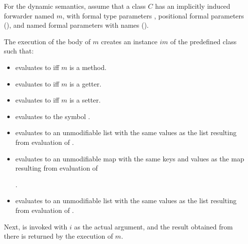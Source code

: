 \documentclass[makeidx]{article}
\begin{document}
\LMHash{}%
For the dynamic semantics,
assume that a class $C$ has an implicitly induced
 forwarder named $m$,
with formal type parameters
,
positional formal parameters
(),
and named formal parameters with names
().


\LMHash{}%
The execution of the body of $m$ creates
an instance $im$ of the predefined class 
such that:

\begin{itemize}
\item {} evaluates to \code{\TRUE{}} if{}f $m$ is a method.
\item {} evaluates to \code{\TRUE{}} if{}f $m$ is a getter.
\item {} evaluates to \code{\TRUE{}} if{}f $m$ is a setter.
\item {} evaluates to the symbol .
\item {} evaluates to an unmodifiable list
  with the same values as the list resulting from evaluation of
  .
\item {} evaluates to an unmodifiable map
  with the same keys and values as the map resulting from evaluation of

  .
\item {} evaluates to an unmodifiable list
  with the same values as the list resulting from evaluation of
  .
\end{itemize}

\LMHash{}%
Next,  is invoked with $i$ as the actual argument,
and the result obtained from there is returned by the execution of $m$.
\end{document}
